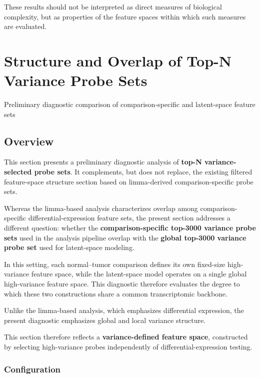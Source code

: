 \documentclass[
  letterpaper,
  DIV=11,
  numbers=noendperiod,
  openany,
  oneside]{scrreprt}
\begin{document}
These results should not be interpreted as direct measures of biological
complexity, but as properties of the feature spaces within which such
measures are evaluated.

\chapter{Structure and Overlap of Top-N Variance Probe
Sets}\label{structure-and-overlap-of-top-n-variance-probe-sets}

Preliminary diagnostic comparison of comparison-specific and
latent-space feature sets

\hfill\break

\section{Overview}\label{overview-8}

This section presents a preliminary diagnostic analysis of \textbf{top-N
variance-selected probe sets}. It complements, but does not replace, the
existing filtered feature-space structure section based on limma-derived
comparison-specific probe sets.

Whereas the limma-based analysis characterizes overlap among
comparison-specific differential-expression feature sets, the present
section addresses a different question: whether the
\textbf{comparison-specific top-3000 variance probe sets} used in the
analysis pipeline overlap with the \textbf{global top-3000 variance
probe set} used for latent-space modeling.

In this setting, each normal--tumor comparison defines its own
fixed-size high-variance feature space, while the latent-space model
operates on a single global high-variance feature space. This diagnostic
therefore evaluates the degree to which these two constructions share a
common transcriptomic backbone.

Unlike the limma-based analysis, which emphasizes differential
expression, the present diagnostic emphasizes global and local variance
structure.

This section therefore reflects a \textbf{variance-defined feature
space}, constructed by selecting high-variance probes independently of
differential-expression testing.

\subsection{Configuration}\label{configuration}
\end{document}
